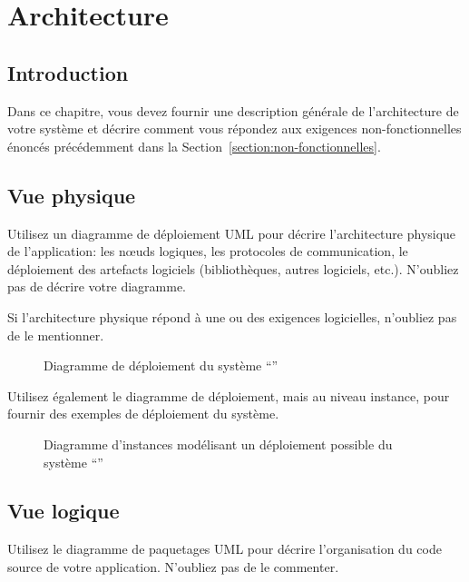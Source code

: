 
\chapter{Architecture}

\section{Introduction}
	Dans ce chapitre, vous devez fournir une description générale de l'architecture de votre système et décrire comment vous répondez aux exigences non-fonctionnelles énoncés précédemment dans la Section~\ref{section:non-fonctionnelles}.


\section{Vue physique}

Utilisez un diagramme de déploiement UML pour décrire l'architecture physique de l'application: les nœuds logiques, les protocoles de communication, le déploiement des artefacts logiciels (bibliothèques, autres logiciels, etc.).
N'oubliez pas de décrire votre diagramme.

Si l'architecture physique répond à une ou des exigences logicielles, n'oubliez pas de le mentionner.

\begin{figure}[!htbp]
\begin{center}

\caption{Diagramme de déploiement du système ``\projet{}''}
\end{center}
\end{figure} 

Utilisez également le diagramme de déploiement, mais au niveau instance, pour fournir des exemples de déploiement du système.

\begin{figure}[!htbp]
\begin{center}

\caption{Diagramme d'instances modélisant un déploiement possible du système ``\projet{}''}
\end{center}
\end{figure} 


\section{Vue logique}
Utilisez le diagramme de paquetages UML pour décrire l'organisation du code source de votre application.
N'oubliez pas de le commenter.

